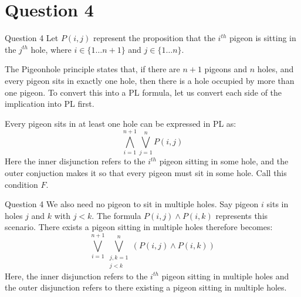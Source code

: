 \documentclass{beamer}
\begin{document}
    \section{Question 4}
    {
        \begin{frame}{Question 4}
            Let $P(i, j)$ represent the proposition that the $i^{th}$ pigeon is sitting in the $j^{th}$ hole, where $i \in \{1\dots n + 1\}$ and $j \in \{1\dots n\}$.

            The Pigeonhole principle states that, if there are $n + 1$ pigeons and $n$ holes, and every pigeon sits in exactly one hole, then there is a hole occupied by more than one pigeon. To convert this into a PL formula, let us convert each side of the implication into PL first.

            Every pigeon sits in at least one hole can be expressed in PL as:
            \begin{equation*}
                \bigwedge\limits_{i = 1}^{n + 1} \bigvee\limits_{j = 1}^{n} P(i, j)
            \end{equation*}
            Here the inner disjunction refers to the $i^{th}$ pigeon sitting in some hole, and the outer conjuction makes it so that every pigeon must sit in some hole. Call this condition $F$.
        \end{frame}
        \begin{frame}{Question 4}
            We also need no pigeon to sit in multiple holes. Say pigeon $i$ sits in holes $j$ and $k$ with $j < k$. The formula $P(i, j) \land P(i, k)$ represents this scenario. There exists a pigeon sitting in multiple holes therefore becomes:
            \begin{equation*}
                \bigvee\limits_{i = 1}^{n + 1} \bigvee\limits_{\substack{j, k = 1\\j < k}}^{n} \left(P(i, j) \land P(i, k)\right)
            \end{equation*}
            Here, the inner disjunction refers to the $i^{th}$ pigeon sitting in multiple holes and the outer disjunction refers to there existing a pigeon sitting in multiple holes.
            

\end{frame}}
\end{document}

